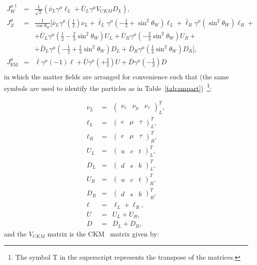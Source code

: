 \begin{eqnarray}
\displaystyle
J^{\mu \dagger}_W&=&\frac{1}{\sqrt{2}} ( \bar{\nu}_L \gamma^{\mu} \ell_L + \bar{U}_L \gamma^{\mu} V_{CKM} D_L ), \\
J^{\mu}_Z&=&\frac{1}{\cos \theta_W} \Big[ \bar{\nu}_L \gamma^\mu (\frac{1}{2}) \nu_L + \bar{\ell}_L \gamma^\mu (-\frac{1}{2} + \sin^2\theta_W)\ell_L + \bar{\ell}_R \gamma^\mu (\sin^2 \theta_W)\ell_R + \nonumber \\
 && + \bar{U}_L \gamma^\mu (\frac{1}{2} - \frac{2}{3} \sin^2 \theta_W) U_L + \bar{U}_R \gamma^\mu (-\frac{2}{3} \sin^2 \theta_W) U_R + \nonumber \\
&& + \bar{D}_L \gamma^\mu (-\frac{1}{2} + \frac{1}{3} \sin^2 \theta_W) D_L + \bar{D}_R \gamma^\mu (\frac{1}{3} \sin^2 \theta_W) D_R \Big] , \\
J^{\mu}_{\textrm{EM}}&=&\bar{\ell} \gamma^\mu (-1) \ell + \bar{U} \gamma^\mu (+\frac{2}{3}) U + \bar{D} \gamma^\mu (-\frac{1}{3}) D \\
\label{eq:w_current}
\end{eqnarray}
in which the matter fields are arranged for convenience such that (the same symbols are used to identify the particles as in Table~\ref{tab:smpart})~\footnote{The symbol T in the superscript represents
the transpose of the matrices.}:

\begin{eqnarray}
\displaystyle
\nu_L &= &\begin{pmatrix} \nu_e & \nu_\mu & \nu_\tau\end{pmatrix}^T_L , \\
\ell_L &= & \begin{pmatrix} e & \mu & \tau \end{pmatrix}^T_L ,\\
\ell_R &= & \begin{pmatrix} e & \mu & \tau \end{pmatrix}^T_R ,\\
U_L&=&\begin{pmatrix} u & c & t\end{pmatrix}^T_L ,\\
D_L&=&\begin{pmatrix} d & s & b\end{pmatrix}^T_L ,\\
U_R&=&\begin{pmatrix} u & c & t\end{pmatrix}^T_R ,\\
D_R&=&\begin{pmatrix} d & s & b\end{pmatrix}^T_R ,\\
\ell &=& \ell_L + \ell_R , \\
U&=&U_L+U_R , \\
D&=&D_L+D_R ,
\label{eq:fields}
\end{eqnarray}
and the
$V_{CKM}$ matrix is the CKM~\cite{cabbibo,kobayashi} matrix given by:

